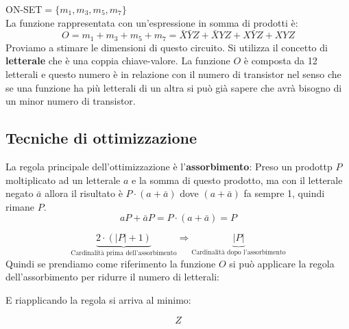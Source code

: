 \documentclass[a4paper]{article}
\theoremstyle{break}
\theoremstyle{break}
\theoremstyle{break}
\theoremstyle{break}
\begin{document}
ON-SET\(=\{ m_1,m_3,m_5,m_7 \} \)\\
La funzione rappresentata con un'espressione in somma di prodotti è:
\[ O=m_1+m_3+m_5+m_7 = \bar{X}\bar{Y}Z + \bar{X}YZ + X\bar{Y}Z + XYZ \]
Proviamo a stimare le dimensioni di questo circuito. Si utilizza il concetto
di \textbf{letterale} che è una coppia chiave-valore. La funzione \( O \)
è composta da 12 letterali e questo numero è in relazione con il numero di
transistor nel senso che se una funzione ha più letterali di un altra si può
già sapere che avrà bisogno di un minor numero di transistor.


\subsection{Tecniche di ottimizzazione}
La regola principale dell'ottimizzazione è l'\textbf{assorbimento}:
Preso un prodottp \( P \)  moltiplicato ad un letterale \( a \) e la somma di
questo prodotto, ma con il letterale negato \( \bar{a} \) allora il risultato
è \( P \cdot  (a+\bar{a}) \) dove \( (a+\bar{a}) \) fa sempre 1, quindi rimane
\( P \).
\[
	aP+\bar{a}P=P \cdot (a+\bar{a}) = P
\]

\[
    \underbrace{2 \cdot (|P|+1)}_{\text{Cardinalità prima dell'assorbimento}} \Rightarrow \underbrace{|P|}_{\text{Cardinalità dopo l'assorbimento}}
\]
Quindi se prendiamo come riferimento la funzione \( O \) si può applicare la
regola dell'assorbimento per ridurre il numero di letterali:
\begin{center}
\end{center}
E riapplicando la regola si arriva al minimo:
\begin{center}
\end{center}
\[
	Z
\]
\end{document}
